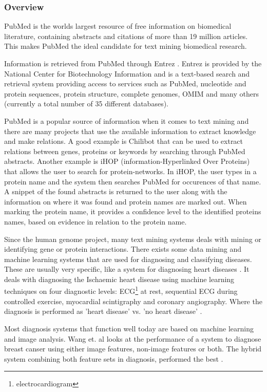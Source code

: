 \subsubsection{Overview}
PubMed \cite{PubMedFactSheet} is the worlds largest resource of free
information on biomedical literature, containing abstracts and
citations of more than 19 million articles. This makes PubMed the
ideal candidate for text mining biomedical research.

Information is retrieved from PubMed through Entrez
\cite{Entrez}. Entrez is provided by the National Center for
Biotechnology Information \cite{NCBIFactSheet} and is a text-based
search and retrieval system providing access to services such as
PubMed, nucleotide and protein sequences, protein structure, complete
genomes, OMIM and many others (currently a total number of 35
different databases).

PubMed is a popular source of information when it comes to text mining
and there are many projects that use the available information to
extract knowledge and make relations. A good example is Chilibot
\cite{Chilibot} that can be used to extract relations between genes,
proteins or keywords by searching through PubMed abstracts. Another
example is iHOP \cite{IHOP} (information-Hyperlinked Over Proteins)
that allows the user to search for protein-networks. In iHOP, the user
types in a protein name and the system then searches PubMed for
occurences of that name. A snippet of the found abstracts is returned
to the user along with the information on where it was found and
protein names are marked out. When marking the protein name, it
provides a confidence level to the identified proteins names, based on
evidence in relation to the protein name.

Since the human genome project, many text mining systems deals with
mining or identifying gene or protein interactions. There exists some
data mining and machine learning systems that are used for diagnosing
and classifying diseases. These are usually very specific, like a
system for diagnosing heart diseases
\cite{DiagnosingIschaemicHeartDiseaseML}. It deals with diagnosing the
Ischaemic heart disease using machine learning techniques on four
diagnostic levels: ECG\footnote{electrocardiogram} at rest, sequential
ECG during controlled exercise, myocardial scintigraphy and coronary
angiography. Where the diagnosis is performed as 'heart disease'
vs. 'no heart disease' \cite{SVMHeartDiseaseClassification}.

Most diagnosis systems that function well today are based on machine
learning and image analysis. Wang et. al looks at the performance of a
system to diagnose breast canser using either image features,
non-image features or both. The hybrid system combining both feature
sets in diagnosis, performed the best \cite{Wang1999115}.

